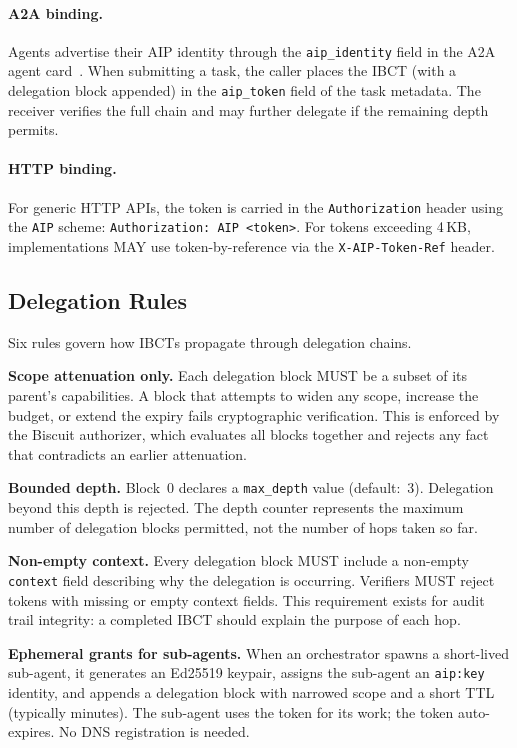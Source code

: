 \documentclass[11pt,a4paper]{article}
\newcommand{\aip}{\textsc{AIP}}
\newcommand{\ibct}{\textsc{IBCT}}
\newcommand{\atoa}{\textsc{A2A}}
\begin{document}
\paragraph{\atoa{} binding.} Agents advertise their \aip{} identity through the \texttt{aip\_identity} field in the \atoa{} agent card~\citep{google2025a2a}. When submitting a task, the caller places the \ibct{} (with a delegation block appended) in the \texttt{aip\_token} field of the task metadata. The receiver verifies the full chain and may further delegate if the remaining depth permits.

\paragraph{HTTP binding.} For generic HTTP APIs, the token is carried in the \texttt{Authorization} header using the \texttt{AIP} scheme: \texttt{Authorization: AIP <token>}. For tokens exceeding 4\,KB, implementations MAY use token-by-reference via the \texttt{X-AIP-Token-Ref} header.

\subsection{Delegation Rules}
\label{sec:delegation}

Six rules govern how \ibct{}s propagate through delegation chains.

\textbf{Scope attenuation only.} Each delegation block MUST be a subset of its parent's capabilities. A block that attempts to widen any scope, increase the budget, or extend the expiry fails cryptographic verification. This is enforced by the Biscuit authorizer, which evaluates all blocks together and rejects any fact that contradicts an earlier attenuation.

\textbf{Bounded depth.} Block~0 declares a \texttt{max\_depth} value (default:~3). Delegation beyond this depth is rejected. The depth counter represents the maximum number of delegation blocks permitted, not the number of hops taken so far.

\textbf{Non-empty context.} Every delegation block MUST include a non-empty \texttt{context} field describing why the delegation is occurring. Verifiers MUST reject tokens with missing or empty context fields. This requirement exists for audit trail integrity: a completed \ibct{} should explain the purpose of each hop.

\textbf{Ephemeral grants for sub-agents.} When an orchestrator spawns a short-lived sub-agent, it generates an Ed25519 keypair, assigns the sub-agent an \texttt{aip:key} identity, and appends a delegation block with narrowed scope and a short TTL (typically minutes). The sub-agent uses the token for its work; the token auto-expires. No DNS registration is needed.
\end{document}
